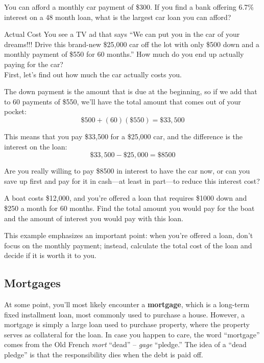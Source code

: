 \begin{try}
You can afford a monthly car payment of \$300.  If you find a bank offering 6.7\% interest on a 48 month loan, what is the largest car loan you can afford?
\end{try}

\begin{example}[https://www.youtube.com/watch?v=rhTeMJm8-Lc]{Actual Cost}
You see a TV ad that says ``We can put you in the car of your dreams!!! Drive this brand-new \$25,000 car off the lot with only \$500 down and a monthly payment of \$550 for 60 months.''  How much do you end up actually paying for the car?\\

First, let's find out how much the car actually costs you.

The down payment is the amount that is due at the beginning, so if we add that to 60 payments of \$550, we'll have the total amount that comes out of your pocket:
\[\$500 + (60)(\$550) = \$33,500\]

This means that you pay \$33,500 for a \$25,000 car, and the difference is the interest on the loan:\marginnote{\footnotesize\textcolor{black!60}{Photo by Christopher Ziemnowicz}}
\[\$33,500 - \$25,000 = \$8500\]

Are you really willing to pay \$8500 in interest to have the car now, or can you save up first and pay for it in cash---at least in part---to reduce this interest cost?
\end{example}

\begin{try}
A boat costs \$12,000, and you're offered a loan that requires \$1000 down and \$250 a month for 60 months.  Find the total amount you would pay for the boat and the amount of interest you would pay with this loan.
\end{try}

This example emphasizes an important point: when you're offered a loan, don't focus on the monthly payment; instead, calculate the total cost of the loan and decide if it is worth it to you.
\vfill
\pagebreak

\subsection{Mortgages}
At some point, you'll most likely encounter a \textbf{mortgage}, which is a long-term fixed installment loan, most commonly used to purchase a house.  However, a mortgage is simply a large loan used to purchase property, where the property serves as collateral for the loan.  In case you happen to care, the word ``mortgage'' comes from the Old French \textit{mort} ``dead'' -- \textit{gage} ``pledge.''  The idea of a ``dead pledge'' is that the responsibility dies when the debt is paid off.\\

